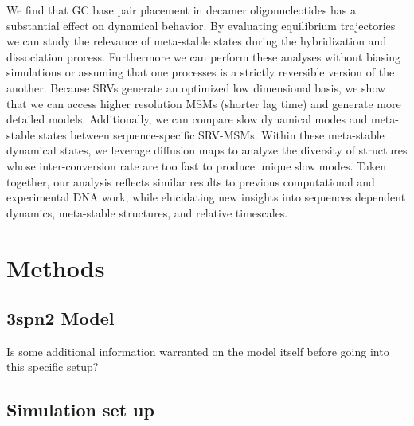 \documentclass[journal=jpcbfk,manuscript=article]{achemso}
\begin{document}
We find that GC base pair placement in decamer oligonucleotides has a substantial effect on dynamical behavior. By evaluating equilibrium trajectories we can study the relevance of meta-stable states during the hybridization and dissociation process. Furthermore we can perform these analyses without biasing simulations or assuming that one processes is a strictly reversible version of the another. Because SRVs generate an optimized low dimensional basis, we show that we can access higher resolution MSMs (shorter lag time) and generate more detailed models. Additionally, we can compare slow dynamical modes and meta-stable states between sequence-specific SRV-MSMs. Within these meta-stable dynamical states, we leverage diffusion maps to analyze the diversity of structures whose inter-conversion rate are too fast to produce unique slow modes. Taken together, our analysis reflects similar results to previous computational and experimental DNA work, while elucidating new insights into sequences dependent dynamics, meta-stable structures, and relative timescales. 

\section{\label{sec:methods}Methods}

\subsection{\label{sec:methods}3spn2 Model}

Is some additional information warranted on the model itself before going into this specific setup?

\subsection{\label{sec:methods}Simulation set up}
\end{document}
